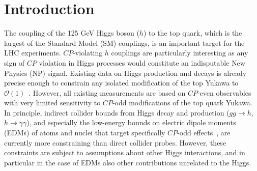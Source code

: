 \documentclass[11pt,a4paper]{article}
\begin{document}
%
\section{Introduction}
%
The coupling of the 125 GeV Higgs boson ($h$) to the top quark, which is the largest of the Standard Model (SM) couplings, is an important target for the LHC experiments. $CP$-violating $h$ couplings are particularly interesting as any sign of $CP$ violation in Higgs processes would constitute an indisputable New Physics (NP) signal. Existing data on Higgs production and decays is already precise enough to constrain any isolated modification of the top Yukawa to $\mathcal O(1)$~\cite{Ellis:2013yxa,Khachatryan:2016vau,Bhattacharyya:2012tj}. However, all existing measurements are based on $CP$-even observables with very limited sensitivity to $CP$-odd modifications of the top quark Yukawa. In principle, indirect collider bounds from Higgs decay and production ($gg \to h$, $h \to \gamma\gamma$), and especially the low-energy bounds on electric dipole moments (EDMs) of atoms and nuclei that target specifically $CP$-odd effects~\cite{Brod:2013cka,Ellis:2013yxa,Boudjema:2015nda}, are currently more constraining than direct collider probes. However, these constraints are subject to assumptions about other Higgs interactions, and in particular in the case of EDMs also other contributions unrelated to the Higgs.
\end{document}
